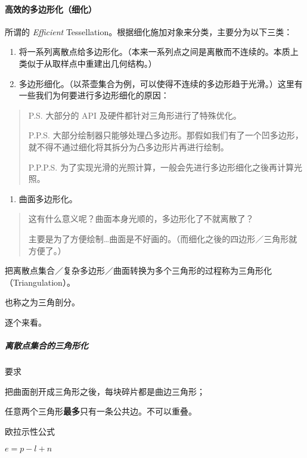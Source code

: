 \documentclass[
]{article}
\begin{document}
\hypertarget{header-n24}{%
\paragraph{高效的多边形化（细化）}\label{header-n24}}

所谓的 \emph{Efficient}
Tessellation。根据细化施加对象来分类，主要分为以下三类：

\begin{enumerate}
\def\labelenumi{\arabic{enumi}.}
\item
  将一系列离散点给多边形化。（本来一系列点之间是离散而不连续的。本质上类似于从取样点中重建出几何结构。）
\item
  多边形细化。（以茶壶集合为例，可以使得不连续的多边形趋于光滑。）这里有一些我们为何要进行多边形细化的原因：
\end{enumerate}

\begin{quote}
P.S. 大部分的 API 及硬件都针对三角形进行了特殊优化。

P.P.S.
大部分绘制器只能够处理凸多边形。那假如我们有了一个凹多边形，就不得不通过细化将其拆分为凸多边形片再进行绘制。

P.P.P.S. 为了实现光滑的光照计算，一般会先进行多边形细化之後再计算光照。
\end{quote}

\begin{enumerate}
\def\labelenumi{\arabic{enumi}.}
\item
  曲面多边形化。
\end{enumerate}

\begin{quote}
这有什么意义呢？曲面本身光顺的，多边形化了不就离散了？

主要是为了方便绘制\ldots 曲面是不好画的。（而细化之後的四边形／三角形就方便了。）
\end{quote}

把离散点集合／复杂多边形／曲面转换为多个三角形的过程称为三角形化（Triangulation）。

也称之为三角剖分。

逐个来看。

\hypertarget{header-n44}{%
\subparagraph{离散点集合的三角形化}\label{header-n44}}

要求

把曲面剖开成三角形之後，每块碎片都是曲边三角形；

任意两个三角形\textbf{最多}只有一条公共边。不可以重叠。

欧拉示性公式

\(e = p - l + n\)
\end{document}

